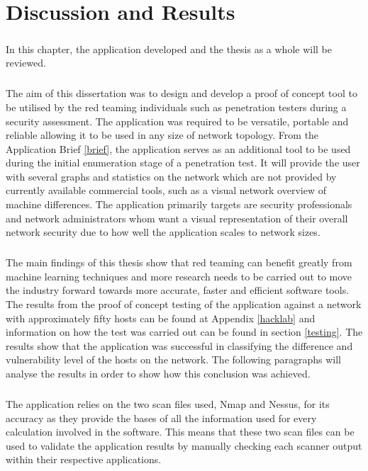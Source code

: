 \chapter{Discussion and Results}
\label{discussion}

\paragraph{}In this chapter, the application developed and the thesis as a whole will be reviewed. 
\paragraph{}The aim of this dissertation was to design and develop a proof of concept tool to be utilised by the red teaming individuals such as penetration testers during a security assessment. The application was required to be versatile, portable and reliable allowing it to be used in any size of network topology. From the Application Brief \ref{brief}, the application serves as an additional tool to be used during the initial enumeration stage of a penetration test. It will provide the user with several graphs and statistics on the network which are not provided by currently available commercial tools, such as a visual network overview of machine differences. The application primarily targets are security professionals and network administrators whom want a visual representation of their overall network security due to how well the application scales to network sizes.
\paragraph{}The main findings of this thesis show that red teaming can benefit greatly from machine learning techniques and more research needs to be carried out to move the industry forward towards more accurate, faster and efficient software tools. The results from the proof of concept testing of the application against a network with approximately fifty hosts can be found at Appendix \ref{hacklab} and information on how the test was carried out can be found in section \ref{testing}. The results show that the application was successful in classifying the difference and vulnerability level of the hosts on the network. The following paragraphs will analyse the results in order to show how this conclusion was achieved.
\paragraph{}The application relies on the two scan files used, Nmap and Nessus, for its accuracy as they provide the bases of all the information used for every calculation involved in the software. This means that these two scan files can be used to validate the application results by manually checking each scanner output within their respective applications. \linebreak
